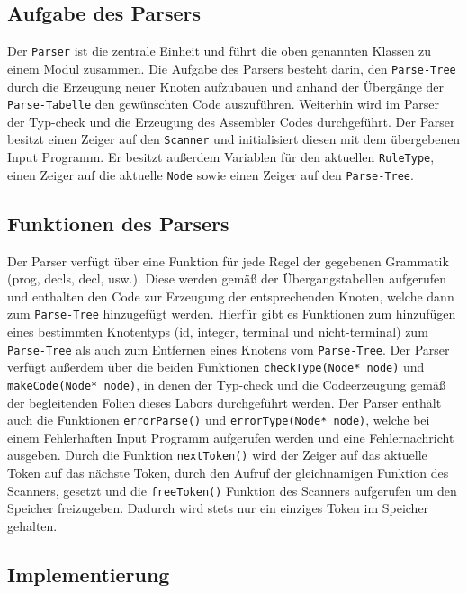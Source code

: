 \documentclass[
a4paper,   %
11pt,      %
oneside,   %
onecolumn, %
final      %
]{article}
\newcommand{\code}[1]{\lstinline$#1$}
\begin{document}
\subsection{Aufgabe des Parsers}
Der \code{Parser} ist die zentrale Einheit und führt die oben genannten Klassen zu einem Modul zusammen. Die Aufgabe des Parsers besteht darin, den \code{Parse-Tree} durch die Erzeugung neuer Knoten aufzubauen und anhand der Übergänge der \code{Parse-Tabelle} den gewünschten Code auszuführen. Weiterhin wird im Parser der Typ-check und die Erzeugung des Assembler Codes durchgeführt. Der Parser besitzt einen Zeiger auf den \code{Scanner} und initialisiert diesen mit dem übergebenen Input Programm. Er besitzt außerdem Variablen für den aktuellen \code{RuleType}, einen Zeiger auf die aktuelle \code{Node} sowie einen Zeiger auf den \code{Parse-Tree}.

\subsection{Funktionen des Parsers}
Der Parser verfügt über eine Funktion für jede Regel der gegebenen Grammatik (prog, decls, decl, usw.). Diese werden gemäß der Übergangstabellen aufgerufen und enthalten den Code zur Erzeugung der entsprechenden Knoten, welche dann zum \code{Parse-Tree} hinzugefügt werden. Hierfür gibt es Funktionen zum hinzufügen eines bestimmten Knotentyps (id, integer, terminal und nicht-terminal) zum \code{Parse-Tree} als auch zum Entfernen eines Knotens vom \code{Parse-Tree}. Der Parser verfügt außerdem über die beiden Funktionen \code{checkType(Node* node)} und \code{makeCode(Node* node)}, in denen der Typ-check und die Codeerzeugung gemäß der begleitenden Folien dieses Labors durchgeführt werden. Der Parser enthält auch die Funktionen \code{errorParse()} und \code{errorType(Node* node)}, welche bei einem Fehlerhaften Input Programm aufgerufen werden und eine Fehlernachricht ausgeben. Durch die Funktion \code{nextToken()} wird der Zeiger auf das aktuelle Token auf das nächste Token, durch den Aufruf der gleichnamigen Funktion des Scanners, gesetzt und die \code{freeToken()} Funktion des Scanners aufgerufen um den Speicher freizugeben. Dadurch wird stets nur ein einziges Token im Speicher gehalten.

\subsection{Implementierung}
\end{document}
